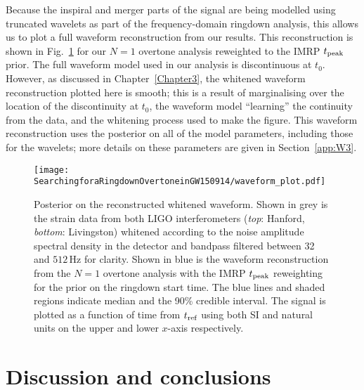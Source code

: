 Because the inspiral and merger parts of the signal are being modelled using truncated wavelets as part of the frequency-domain ringdown analysis, this allows us to plot a full waveform reconstruction from our results.
This reconstruction is shown in Fig.~\ref{fig:waveform} for our $N=1$ overtone analysis reweighted to the IMRP $t_{\rm peak}$ prior.
The full waveform model used in our analysis is discontinuous at $t_0$. However, as discussed in Chapter~\ref{Chapter3}, the whitened waveform reconstruction plotted here is smooth; this is a result of marginalising over the location of the discontinuity at $t_0$, the waveform model ``learning'' the continuity from the data, and the whitening process used to make the figure.
This waveform reconstruction uses the posterior on all of the model parameters, including those for the wavelets; more details on these parameters are given in Section~\ref{app:W3}.

\begin{figure}[t]
    \centering
    \texttt{[image: SearchingforaRingdownOvertoneinGW150914/waveform\_plot.pdf]}
    \caption[Posterior on the GW150914 reconstructed whitened waveform]{ 
    Posterior on the reconstructed whitened waveform.
    Shown in grey is the strain data from both LIGO interferometers (\emph{top}: Hanford, \emph{bottom}: Livingston) whitened according to the noise amplitude spectral density in the detector and bandpass filtered between 32 and $512\,\mathrm{Hz}$ for clarity.
    Shown in blue is the waveform reconstruction from the $N=1$ overtone analysis with the IMRP $t_{\rm peak}$ reweighting for the prior on the ringdown start time.
    The blue lines and shaded regions indicate median and the 90\% credible interval. 
    The signal is plotted as a function of time from $t_{\rm ref}$ using both SI and natural units on the upper and lower $x$-axis respectively.
    }
    \label{fig:waveform}
\end{figure}


\section{Discussion and conclusions}\label{ch4:sec:discussion}

